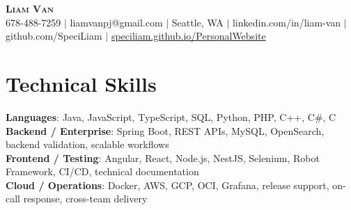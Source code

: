 \documentclass[letterpaper,11pt]{article}
\begin{document}

%
\begin{center}
    \textbf{\Huge \scshape Liam Van} \\ \vspace{1pt}
    \small 678-488-7259 $|$ \small {liamvanpj@gmail.com} $|$ Seattle, WA
 {{$|$ linkedin.com/in/liam-van} {$|$ github.com/SpeciLiam} {$|$ \href{https://speciliam.github.io/PersonalWebsite}{speciliam.github.io/PersonalWebsite}}}

\end{center}

\section{Technical Skills}
 \begin{itemize}[leftmargin=0.15in, label={}]
    \small{\item{
     \textbf{Languages}{: Java, JavaScript, TypeScript, SQL, Python, PHP, C++, C\#, C} \\
     \textbf{Backend / Enterprise}{: Spring Boot, REST APIs, MySQL, OpenSearch, backend validation, scalable workflows} \\
     \textbf{Frontend / Testing}{: Angular, React, Node.js, NestJS, Selenium, Robot Framework, CI/CD, technical documentation} \\
     \textbf{Cloud / Operations}{: Docker, AWS, GCP, OCI, Grafana, release support, on-call response, cross-team delivery} \\
    }}
 \end{itemize}
%
\end{document}
